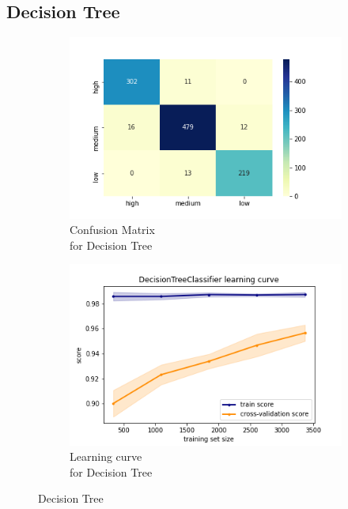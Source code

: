 \subsection{Decision Tree}
\begin{figure}[h!]
     \captionsetup{justification=centering}             
     \centering
     \begin{subfigure}{0.49\textwidth}
         \centering
         \captionsetup{type=figure}
         \includegraphics[scale=0.45]{img/classification/dt_confusion.png}
         \caption{Confusion Matrix \\ for Decision Tree}
         \label{fig:dt_confusion}
     \end{subfigure}
     \begin{subfigure}{0.49\textwidth}
         \centering
         \includegraphics[scale=0.45]{img/classification/dt_lc.png}
         \caption{Learning curve \\ for Decision Tree}
         \label{fig:dt_lc}
     \end{subfigure}
     \caption{Decision Tree}
    \label{fig:dt}
\end{figure}

